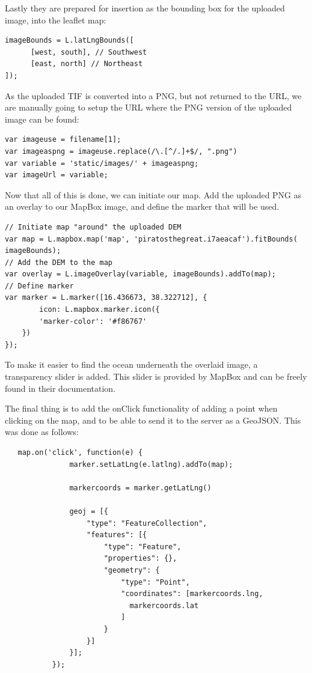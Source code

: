 Lastly they are prepared for insertion as the bounding box for the uploaded image, into the leaflet map:


\begin{lstlisting}
imageBounds = L.latLngBounds([
      [west, south], // Southwest
      [east, north] // Northeast
]);
\end{lstlisting}

As the uploaded TIF is converted into a PNG, but not returned to the URL, we are manually going to setup the URL where the PNG version of the uploaded image can be found:

\begin{lstlisting}
var imageuse = filename[1];
var imageaspng = imageuse.replace(/\.[^/.]+$/, ".png")
var variable = 'static/images/' + imageaspng;
var imageUrl = variable;
\end{lstlisting}

Now that all of this is done, we can initiate our map. Add the uploaded PNG as an overlay to our MapBox image, and define the marker that will be used.   

\begin{lstlisting}
// Initiate map "around" the uploaded DEM
var map = L.mapbox.map('map', 'piratosthegreat.i7aeacaf').fitBounds(
imageBounds);
// Add the DEM to the map
var overlay = L.imageOverlay(variable, imageBounds).addTo(map);
// Define marker
var marker = L.marker([16.436673, 38.322712], {
		icon: L.mapbox.marker.icon({
		'marker-color': '#f86767'
    })
});
\end{lstlisting}

To make it easier to find the ocean underneath the overlaid image, a transparency slider is added. This slider is provided by MapBox and can be freely found in their documentation.

The final thing is to add the onClick functionality of adding a point when clicking on the map, and to be able to send it to the server as a GeoJSON. This was done as follows:


\begin{lstlisting}
   map.on('click', function(e) {
               marker.setLatLng(e.latlng).addTo(map);

               markercoords = marker.getLatLng()

               geoj = [{
                   "type": "FeatureCollection",
                   "features": [{
                       "type": "Feature",
                       "properties": {},
                       "geometry": {
                           "type": "Point",
                           "coordinates": [markercoords.lng,
                             markercoords.lat
                           ]
                       }
                   }]
               }];
           });
\end{lstlisting}

